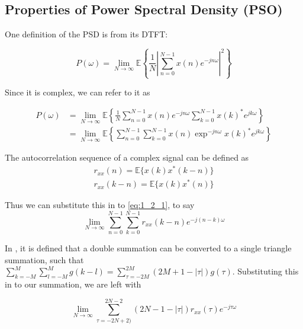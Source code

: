 \documentclass[./main.tex]{subfiles}
\begin{document}
\subsection{Properties of Power Spectral Density (PSO)}

One definition of the PSD is from its DTFT:

\begin{equation}
P(\omega) = \lim\limits_{N \to \infty} \mathbb{E} \left\{ \frac{1}{N} \left| \sum_{n=0}^{N-1} x(n) e^{-j n \omega} \right|^2 \right\}
\end{equation}

Since it is complex, we can refer to it as

\begin{equation}
\begin{split}
P(\omega) &= \lim\limits_{N \to \infty} \mathbb{E} \left\{ \frac{1}{N} \sum_{n=0}^{N-1} x(n) e^{-j n \omega} \sum_{k=0}^{N-1} x(k)^\ast e^{j k \omega}  \right\} \\
&= \lim\limits_{N \to \infty}  \mathbb{E} \left\{ \sum_{n=0}^{N-1} \sum_{k=0}^{N-1} x(n) \exp^{-j n \omega} x(k)^\ast e^{j k \omega} \right\} \label{eq:1_2_1}
\end{split}
\end{equation}

The autocorrelation sequence of a complex signal can be defined as
\begin{equation}
\begin{split}
r_{xx}(n) = \mathbb{E} \{ x(k) x^\ast(k-n) \} \\
r_{xx}(k-n) = \mathbb{E} \{ x(k) x^\ast(n) \}
\end{split}
\end{equation}

Thus we can substitute this in to \ref{eq:1_2_1}, to say 
\begin{equation}
\lim\limits_{N \to \infty}   \sum_{n=0}^{N-1} \sum_{k=0}^{N-1} r_{xx}(k-n) e^{-j(n-k)\omega}
\end{equation}

In \cite{Mandic2014}, it is defined that a double summation can be converted to a single triangle summation, such that $  \sum_{k=-M}^{M} \sum_{l=-M}^{M} g(k-l) = \sum_{\tau=-2M}^{2M}(2M + 1 - |\tau|) g(\tau)$. Substituting this in to our summation, we are left with 

\begin{equation}
\lim\limits_{N \to \infty} \sum_{\tau=-2N+2)}^{2N - 2} (2N - 1 - |\tau|) r_{xx}(\tau) e^{-j \tau \omega}
\end{equation}
\end{document}
